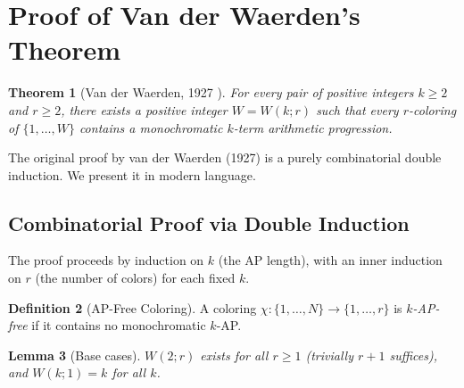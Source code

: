 \documentclass[12pt,a4paper]{amsart}
\newtheorem{theorem}{Theorem}[section]
\newtheorem{lemma}[theorem]{Lemma}
\theoremstyle{definition}
\newtheorem{definition}[theorem]{Definition}
\begin{document}
\section{Proof of Van der Waerden's Theorem}\label{sec:proof-vdw}

\begin{theorem}[Van der Waerden, 1927 \cite{VdW1927}]\label{thm:vdw}
For every pair of positive integers $k \geq 2$ and $r \geq 2$, there exists a
positive integer $W = W(k; r)$ such that every $r$-coloring of $\{1, \ldots, W\}$
contains a monochromatic $k$-term arithmetic progression.
\end{theorem}

The original proof by van der Waerden (1927) is a purely combinatorial double induction.
We present it in modern language.

\subsection{Combinatorial Proof via Double Induction}

The proof proceeds by induction on $k$ (the AP length), with an inner induction on $r$
(the number of colors) for each fixed $k$.

\begin{definition}[AP-Free Coloring]
A coloring $\chi: \{1,\ldots,N\} \to \{1,\ldots,r\}$ is \emph{$k$-AP-free} if it
contains no monochromatic $k$-AP.
\end{definition}

\begin{lemma}[Base cases]
$W(2; r)$ exists for all $r \geq 1$ (trivially $r+1$ suffices), and $W(k; 1) = k$
for all $k$.
\end{lemma}
\end{document}
